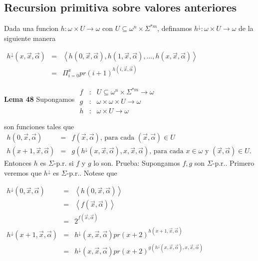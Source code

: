 \subsection{Recursion primitiva sobre valores anteriores}


Dada una funcion \(h:\omega \times U\rightarrow \omega \) con \(U\subseteq \omega ^{n}\times \Sigma ^{\ast m}\), definamos \(h^{\downarrow }:\omega \times U\rightarrow \omega \) de la siguiente manera

\(\displaystyle \begin{array}{rcl} h^{\downarrow }(x,\vec{x},\vec{\alpha}) & =& \left\langle h(0,\vec{x},\vec{ \alpha}),h(1,\vec{x},\vec{\alpha}),...,h(x,\vec{x},\vec{\alpha})\right\rangle \\ & =& \Pi _{i=0}^{x}pr(i+1)^{h(i,\vec{x},\vec{\alpha})} \end{array} \)

\textbf{Lema 48} Supongamos
\(\displaystyle \begin{array}{rcl} f & :& U\subseteq \omega ^{n}\times \Sigma ^{\ast m}\rightarrow \omega \\ g & :& \omega \times \omega \times U\rightarrow \omega \\ h & :& \omega \times U\rightarrow \omega \end{array} \)

son funciones tales que
\(\displaystyle \begin{array}{rcl} h(0,\vec{x},\vec{\alpha}) & =& f(\vec{x},\vec{\alpha})\text{, para cada }(\vec{ x},\vec{\alpha})\in U \\ h(x+1,\vec{x},\vec{\alpha}) & =& g(h^{\downarrow }(x,\vec{x},\vec{\alpha}),x, \vec{x},\vec{\alpha})\text{, para cada }x\in \omega \text{ y }(\vec{x},\vec{ \alpha})\in U\text{.} \end{array} \)
Entonces \(h\) es \(\Sigma \)-p.r. si \(f\) y \(g\) lo son.
Prueba: Supongamos \(f,g\) son \(\Sigma \)-p.r.. Primero veremos que \(h^{\downarrow }\) es \(\Sigma \)-p.r.. Notese que

\(\displaystyle \begin{array}{rcl} h^{\downarrow }(0,\vec{x},\vec{\alpha}) & =& \left\langle h(0,\vec{x},\vec{ \alpha})\right\rangle \\ & =& \left\langle f(\vec{x},\vec{\alpha})\right\rangle \\ & =& 2^{f(\vec{x},\vec{\alpha})} \\ h^{\downarrow }(x+1,\vec{x},\vec{\alpha}) & =& h^{\downarrow }(x,\vec{x},\vec{ \alpha})pr(x+2)^{h(x+1,\vec{x},\vec{\alpha})} \\ & =& h^{\downarrow }(x,\vec{x},\vec{\alpha})pr(x+2)^{g(h^{\downarrow }(x,\vec{x },\vec{\alpha}),x,\vec{x},\vec{\alpha})} \end{array} \)

